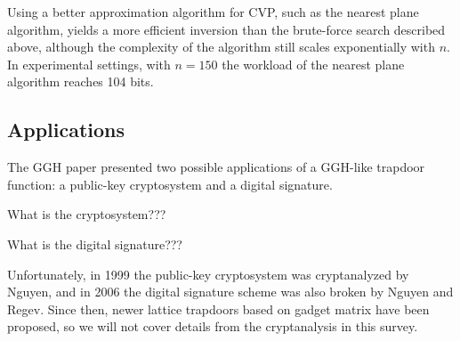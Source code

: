 Using a better approximation algorithm for CVP, such as the nearest plane algorithm, yields a more efficient inversion than the brute-force search described above, although the complexity of the algorithm still scales exponentially with $n$. In experimental settings, with $n=150$ the workload of the nearest plane algorithm reaches 104 bits.

\subsection{Applications}
The GGH paper presented two possible applications of a GGH-like trapdoor function: a public-key cryptosystem and a digital signature.

What is the cryptosystem???

What is the digital signature???

Unfortunately, in 1999 the public-key cryptosystem was cryptanalyzed by Nguyen, and in 2006 the digital signature scheme was also broken by Nguyen and Regev. Since then, newer lattice trapdoors based on gadget matrix have been proposed, so we will not cover details from the cryptanalysis in this survey.